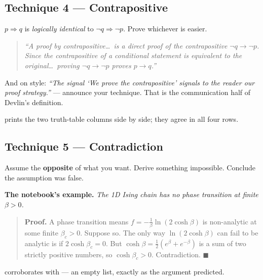 \subsection{Technique 4 --- Contrapositive \ \ }

\begin{techbox}[title={Shape}]
$p\Rightarrow q$ is \emph{logically identical} to $\neg q\Rightarrow\neg p$. Prove whichever is
easier.
\end{techbox}

\begin{bookbox}[title={D\&L §2.2}]
\begin{quote}\itshape
``A proof by contrapositive\ldots\ is a direct proof of the contrapositive $\neg q\to\neg p$. Since
the contrapositive of a conditional statement is equivalent to the original\ldots\ proving
$\neg q\to\neg p$ proves $p\to q$.''
\end{quote}
And on style: \emph{``The signal `We prove the contrapositive' signals to the reader our proof
strategy.''} --- announce your technique. That is the communication half of Devlin's definition.
\end{bookbox}

\noindent {} prints the two truth-table columns side by side; they agree in all four rows.

\subsection{Technique 5 --- Contradiction \ \ }

\begin{techbox}[title={Shape}]
Assume the \textbf{opposite} of what you want. Derive something impossible. Conclude the assumption
was false.
\end{techbox}

\noindent\textbf{The notebook's example.} \emph{The 1D Ising chain has no phase transition at finite
$\beta>0$.}

\begin{quote}
\textbf{Proof.} A phase transition means $f=-\frac1\beta\ln(2\cosh\beta)$ is non-analytic at some
finite $\beta_c>0$. Suppose so. The only way $\ln(2\cosh\beta)$ can fail to be analytic is if
$2\cosh\beta_c=0$. But $\cosh\beta=\tfrac12(e^\beta+e^{-\beta})$ is a sum of two strictly positive
numbers, so $\cosh\beta_c>0$. Contradiction. $\blacksquare$
\end{quote}

 corroborates with  --- an empty list,
exactly as the argument predicted.

